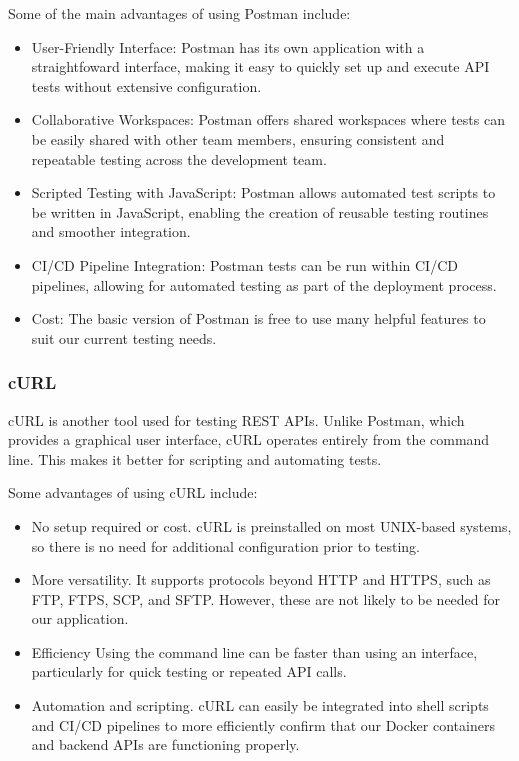\documentclass[12pt]{article}
\begin{document}
Some of the main advantages of using Postman include:
\begin{itemize}
\item User-Friendly Interface: Postman has its own application with a straightfoward interface, making it easy to quickly set up and execute API tests without extensive configuration.
\item Collaborative Workspaces: Postman offers shared workspaces where tests can be easily shared with other team members, ensuring consistent and repeatable testing across the development team.
\item Scripted Testing with JavaScript: Postman allows automated test scripts to be written in JavaScript, enabling the creation of reusable testing routines and smoother integration.
\item CI/CD Pipeline Integration: Postman tests can be run within CI/CD pipelines, allowing for automated testing as part of the deployment process.
\item Cost: The basic version of Postman is free to use many helpful features to suit our current testing needs.
\end{itemize}

\subsubsection{cURL}
cURL is another tool used for testing REST APIs. Unlike Postman, which provides a graphical user interface, cURL operates entirely from the command line. This makes it better for scripting and automating tests.

Some advantages of using cURL include:
\begin{itemize}
    \item No setup required or cost. cURL is preinstalled on most UNIX-based systems, so there is no need for additional configuration prior to testing.
    \item More versatility. It supports protocols beyond HTTP and HTTPS, such as FTP, FTPS, SCP, and SFTP. However, these are not likely to be needed for our application.
    \item Efficiency Using the command line can be faster than using an interface, particularly for quick testing or repeated API calls.
    \item Automation and scripting. cURL can easily be integrated into shell scripts and CI/CD pipelines to more efficiently confirm that our Docker containers and backend APIs are functioning properly.
\end{itemize}
\end{document}
